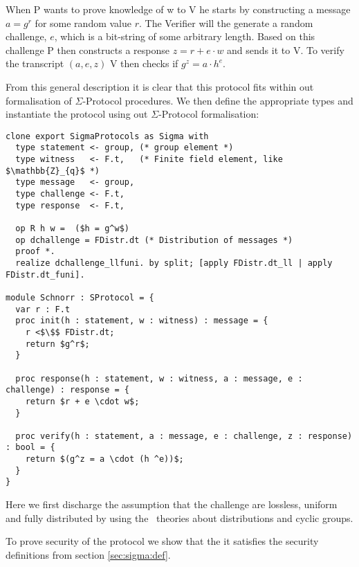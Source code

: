 When P wants to prove knowledge of w to V he starts by
constructing a message $a = g^{r}$ for some random value $r$. The Verifier will
the generate a random challenge, $e$, which is a bit-string of some arbitrary length.
Based on this challenge P then constructs a response $z = r + e \cdot w$ and sends
it to V.
To verify the transcript $(a,e,z)$ V then checks if $g^{z} = a \cdot h^{e}$.

From this general description it is clear that this protocol fits within out
formalisation of $\Sigma$-Protocol procedures. We then define the appropriate
types and instantiate the protocol using out $\Sigma$-Protocol formalisation:

\begin{lstlisting}[mathescape,label=lst:sigma:schnorr,caption=Schnorr instantiation]
clone export SigmaProtocols as Sigma with
  type statement <- group, (* group element *)
  type witness   <- F.t,   (* Finite field element, like $\mathbb{Z}_{q}$ *)
  type message   <- group,
  type challenge <- F.t,
  type response  <- F.t,

  op R h w =  ($h = g^w$)
  op dchallenge = FDistr.dt (* Distribution of messages *)
  proof *.
  realize dchallenge_llfuni. by split; [apply FDistr.dt_ll | apply FDistr.dt_funi].

module Schnorr : SProtocol = {
  var r : F.t
  proc init(h : statement, w : witness) : message = {
    r <$\$$ FDistr.dt;
    return $g^r$;
  }

  proc response(h : statement, w : witness, a : message, e : challenge) : response = {
    return $r + e \cdot w$;
  }

  proc verify(h : statement, a : message, e : challenge, z : response) : bool = {
    return $(g^z = a \cdot (h ^e))$;
  }
}
\end{lstlisting}

Here we first discharge the assumption that the challenge are lossless, uniform
and fully distributed by using the \easycrypt\ theories about distributions and
cyclic groups.

To prove security of the protocol we show that the it satisfies the security
definitions from section \ref{sec:sigma:def}.

